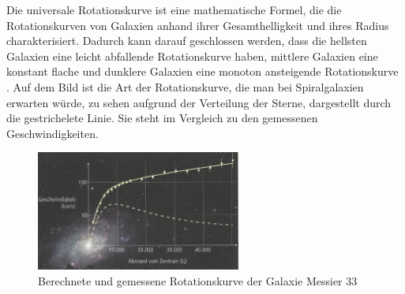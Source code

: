 Die universale Rotationskurve ist eine mathematische Formel, die die Rotationskurven von Galaxien anhand ihrer Gesamthelligkeit und ihres Radius charakterisiert.
Dadurch kann darauf geschlossen werden, dass die hellsten Galaxien eine leicht abfallende Rotationskurve haben, mittlere Galaxien eine konstant flache und dunklere Galaxien eine monoton ansteigende Rotationskurve \cite{SofueVera2000}. 
Auf dem Bild ist die Art der Rotationskurve, die man bei Spiralgalaxien erwarten würde, zu sehen aufgrund der Verteilung der Sterne, dargestellt durch die gestrichelete Linie. Sie steht im Vergleich zu den gemessenen Geschwindigkeiten.
\begin{figure}[H]
	\centering
	\includegraphics[width=0.6\textwidth]{figures/right_curve.jpg}
	\caption[Abbildung 2: Berechnete und beobachtete Rotationskurve ]{Berechnete und gemessene Rotationskurve der Galaxie Messier 33 \cite{Bührke2022}}
	\label{fig Rotationskurve.}
\end{figure}

